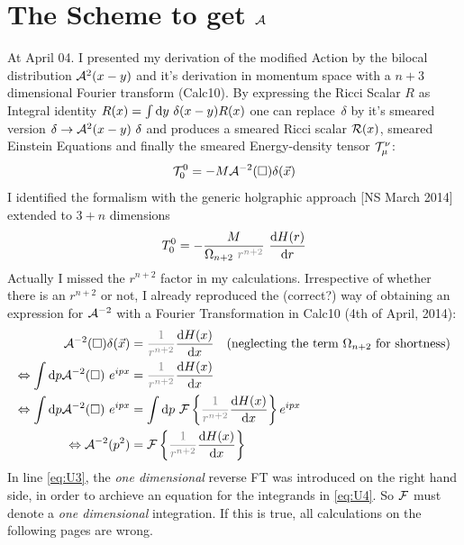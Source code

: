 \documentclass[10pt,a4paper, fleqn]{article}
\begin{document}
\section{The Scheme to get ${\cal A}$}
At April 04. I presented my derivation of the modified Action by the bilocal distribution ${\cal A}^2(x-y)$ and it's derivation in momentum space with a $n+3$ dimensional Fourier transform (Calc10). By expressing the Ricci Scalar $R$ as Integral identity $R(x) = \int \mathrm{d} y~\delta(x-y) R(x)$ one can replace~$\delta$ by it's smeared version $\delta \to {\cal A}^2(x-y)~\delta$ and produces a smeared Ricci scalar ${\cal R}(x)$, smeared Einstein Equations and finally the smeared Energy-density tensor ${\cal T}_\mu^\nu$:
%
\begin{equation}
{\cal T}_0^0 = -M {\cal A}^{-2}(\square) \delta(\vec x)
\end{equation}
I identified the formalism with the generic holgraphic approach [NS March 2014] extended to $3+n$ dimensions
\begin{equation}
T_0^0 = - \frac{M}{\Omega_{n+2}~\mathcolor{gray}{r^{n+2}}} ~ \dd{H(r)}r
\end{equation}
%
Actually I missed the $r^{n+2}$ factor in my calculations. Irrespective of whether there is an $r^{n+2}$ or not, I already reproduced the (correct?) way of obtaining an expression for ${\cal A}^{-2}$ with a Fourier Transformation in Calc10 (4th of April, 2014):
\begin{subequations}
\begin{align}
\CA^{-2}(\square)\delta(\vec x) &= \mathcolor{gray}{\frac 1{r^{n+2}}} \dd{H(x)}x   \quad \text{(neglecting the term }\Omega_{n+2}\text{ for shortness)} \\
\Leftrightarrow  \int \d p \CA^{-2}(\square)~e^{ipx} &= 
\mathcolor{gray}{\frac 1{r^{n+2}}} \dd{H(x)}x
\label{eq:U2}
\\
\Leftrightarrow \int \d p \CA^{-2}(\square)~e^{ipx} &= \int \d p~ \C F \left\{ \mathcolor{gray}{\frac 1{r^{n+2}}} \dd{H(x)}x \right\}  e^{ipx}
\label{eq:U3} 
\\
\Leftrightarrow  \CA^{-2}(p^2) &=  \C F \left\{ \mathcolor{gray}{\frac 1{r^{n+2}}} \dd{H(x)}x \right\}
\label{eq:U4}
\end{align}
\end{subequations}
%
In line \eqref{eq:U3}, the {\it one dimensional} reverse FT was introduced on the right hand side, in order to archieve an equation for the integrands in \eqref{eq:U4}. So ${\cal F}$ must denote a {\it one dimensional} integration. If this is true, all calculations on the following pages are wrong.
\end{document}
